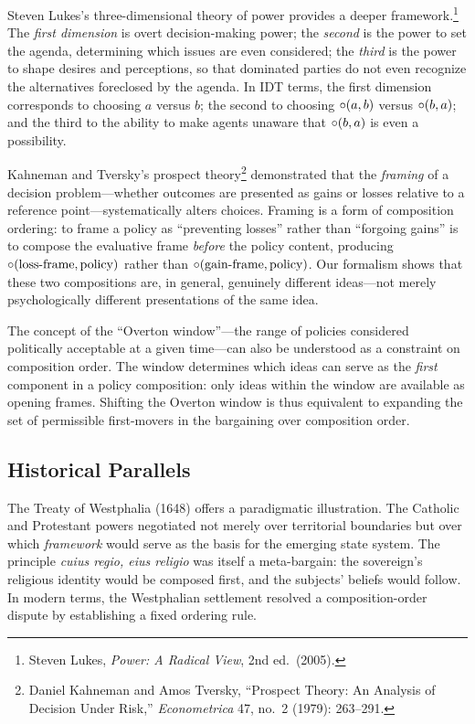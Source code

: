 Steven Lukes's three-dimensional theory of power provides a deeper
framework.\footnote{Steven Lukes, \textit{Power: A Radical View}, 2nd ed.\
(2005).}  The \emph{first dimension} is overt decision-making power; the
\emph{second} is the power to set the agenda, determining which issues are
even considered; the \emph{third} is the power to shape desires and
perceptions, so that dominated parties do not even recognize the
alternatives foreclosed by the agenda.  In IDT terms, the first dimension
corresponds to choosing $a$ versus $b$; the second to choosing
$\circ(a,b)$ versus $\circ(b,a)$; and the third to the ability to
make agents unaware that $\circ(b,a)$ is even a possibility.

Kahneman and Tversky's prospect theory\footnote{Daniel Kahneman and Amos
Tversky, ``Prospect Theory: An Analysis of Decision Under Risk,''
\textit{Econometrica} 47, no.\ 2 (1979): 263--291.} demonstrated that the
\emph{framing} of a decision problem---whether outcomes are presented as
gains or losses relative to a reference point---systematically alters
choices.  Framing is a form of composition ordering: to frame a policy as
``preventing losses'' rather than ``forgoing gains'' is to compose the
evaluative frame \emph{before} the policy content, producing
$\circ(\text{loss-frame}, \text{policy})$ rather than
$\circ(\text{gain-frame}, \text{policy})$.  Our formalism shows that
these two compositions are, in general, genuinely different ideas---not
merely psychologically different presentations of the same idea.

The concept of the ``Overton window''---the range of policies considered
politically acceptable at a given time---can also be understood as a
constraint on composition order.  The window determines which ideas can
serve as the \emph{first} component in a policy composition: only ideas
within the window are available as opening frames.  Shifting the Overton
window is thus equivalent to expanding the set of permissible first-movers
in the bargaining over composition order.

\subsection{Historical Parallels}

The Treaty of Westphalia (1648) offers a paradigmatic illustration.  The
Catholic and Protestant powers negotiated not merely over territorial
boundaries but over which \emph{framework} would serve as the basis for
the emerging state system.  The principle \textit{cuius regio, eius
religio} was itself a meta-bargain: the sovereign's religious identity
would be composed first, and the subjects' beliefs would follow.  In modern
terms, the Westphalian settlement resolved a composition-order dispute by
establishing a fixed ordering rule.


